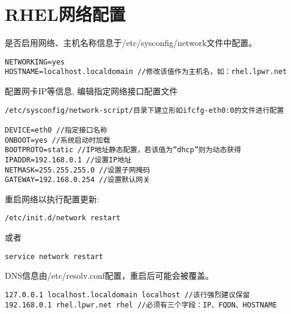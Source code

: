 \section{RHEL网络配置}


是否启用网络、主机名称信息于/etc/sysconfig/network文件中配置。
\begin{verbatim}
NETWORKING=yes
HOSTNAME=localhost.localdomain //修改该值作为主机名，如：rhel.lpwr.net
\end{verbatim}

配置网卡IP等信息, 编辑指定网络接口配置文件
\begin{verbatim}
/etc/sysconfig/network-script/目录下建立形如ifcfg-eth0:0的文件进行配置

DEVICE=eth0 //指定接口名称
ONBOOT=yes //系统启动时加载
BOOTPROTO=static //IP地址静态配置，若该值为“dhcp”则为动态获得
IPADDR=192.168.0.1 //设置IP地址
NETMASK=255.255.255.0 //设置子网掩码
GATEWAY=192.168.0.254 //设置默认网关
\end{verbatim}

重启网络以执行配置更新:

\begin{verbatim}
/etc/init.d/network restart
\end{verbatim}
或者
\begin{verbatim}
service network restart
\end{verbatim}

DNS信息由/etc/resolv.conf配置，重启后可能会被覆盖。

\begin{verbatim}
127.0.0.1 localhost.localdomain localhost //该行强烈建议保留
192.168.0.1 rhel.lpwr.net rhel //必须有三个字段：IP、FQDN、HOSTNAME
\end{verbatim}


